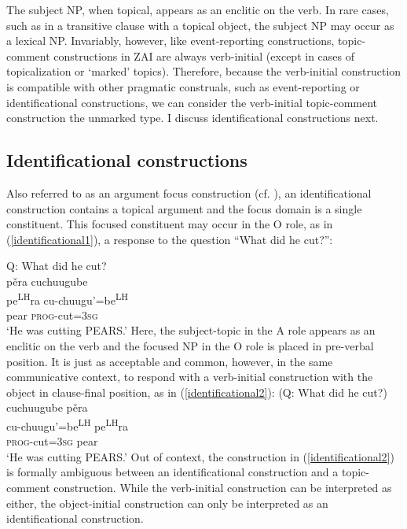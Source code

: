 The subject NP, when topical, appears as an enclitic on the verb. In rare cases, such as in a transitive clause with a topical object, the subject NP may occur as a lexical NP. Invariably, however, like event-reporting constructions, topic-comment constructions in ZAI are always verb-initial (except in cases of topicalization or `marked' topics). Therefore, because the verb-initial construction is compatible with other pragmatic construals, such as event-reporting or identificational constructions, we can consider the verb-initial topic-comment construction the unmarked type. I discuss identificational constructions next.


\subsection{Identificational constructions}\label{identificationalsection}

Also referred to as an argument focus construction (cf. ), an identificational construction contains a topical argument and the focus domain is a single constituent. This focused constituent may occur in the O role, as in (\ref{identificational1}), a response to the question ``What did he cut?'':

\ea\label{identificational1} 
{Q: What did he cut?} \\
\glll p\v{e}ra cuchuugube \\
pe\textsuperscript{LH}ra cu-chuugu'=be\textsuperscript{LH} \\
pear \textsc{prog}-cut=\textsc{3sg} \\
\glt `He was cutting PEARS.'
\z
Here, the subject-topic in the A role appears as an enclitic on the verb and the focused NP in the O role is placed in pre-verbal position. It is just as acceptable and common, however, in the same communicative context, to respond with a verb-initial construction with the object in clause-final position, as in (\ref{identificational2}):
\ea\label{identificational2} 
(Q: What did he cut?) \\
\glll cuchuugube p\v{e}ra  \\
cu-chuugu'=be\textsuperscript{LH} pe\textsuperscript{LH}ra \\
\textsc{prog}-cut=\textsc{3sg} pear  \\
\glt `He was cutting PEARS.'
\z
Out of context, the construction in (\ref{identificational2}) is formally ambiguous between an identificational construction and a topic-comment construction. While the verb-initial construction can be interpreted as either, the object-initial construction can only be interpreted as an identificational construction.

